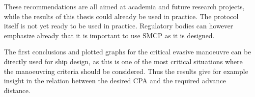 These recommendations are all aimed at academia and future research projects, while the results of this thesis could already be used in practice. The protocol itself is not yet ready to be used in practice. Regulatory bodies can however emphasize already that it is important to use SMCP as it is designed. 

The first conclusions and plotted graphs for the critical evasive manoeuvre can be directly used for ship design, as this is one of the most critical situations where the manoeuvring criteria should be considered. Thus the results give for example insight in the relation between the desired CPA and the required advance distance. 
